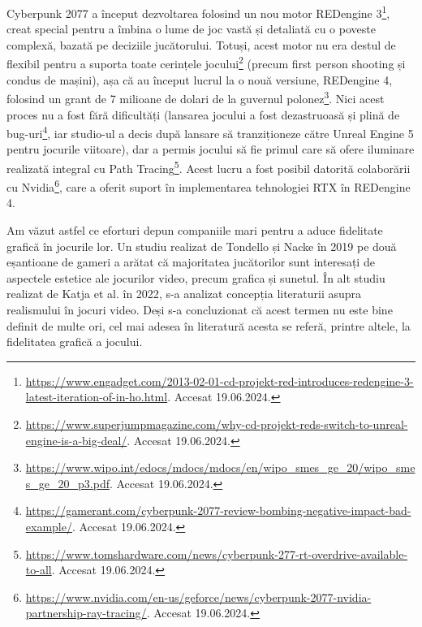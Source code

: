 \documentclass[12pt,a4paper]{report}
\numberwithin{equation}{section} %
\begin{document}
Cyberpunk 2077 a început dezvoltarea folosind un nou motor REDengine 3\footnote{\url{https://www.engadget.com/2013-02-01-cd-projekt-red-introduces-redengine-3-latest-iteration-of-in-ho.html}. Accesat 19.06.2024.},
creat special pentru a îmbina o lume de joc vastă și detaliată cu o poveste complexă,
bazată pe deciziile jucătorului. Totuși, acest motor nu era destul de flexibil pentru
a suporta toate cerințele jocului\footnote{\url{https://www.superjumpmagazine.com/why-cd-projekt-reds-switch-to-unreal-engine-is-a-big-deal/}. Accesat 19.06.2024.}
(precum first person shooting și condus de mașini),
așa că au început lucrul la o nouă versiune, REDengine 4, folosind un grant de 7 milioane
de dolari de la guvernul polonez\footnote{\label{UE5}\url{https://www.wipo.int/edocs/mdocs/mdocs/en/wipo_smes_ge_20/wipo_smes_ge_20_p3.pdf}. Accesat 19.06.2024.}.
Nici acest proces nu a fost fără dificultăți (lansarea jocului a fost dezastruoasă
și plină de bug-uri\footnote{\url{https://gamerant.com/cyberpunk-2077-review-bombing-negative-impact-bad-example/}. Accesat 19.06.2024.},
iar studio-ul a decis după lansare să tranziționeze către Unreal Engine 5 pentru jocurile viitoare),
dar a permis jocului să fie primul care să ofere iluminare realizată integral cu Path Tracing\footnote{\url{https://www.tomshardware.com/news/cyberpunk-277-rt-overdrive-available-to-all}. Accesat 19.06.2024.}.
Acest lucru a fost posibil datorită colaborării cu Nvidia\footnote{\url{https://www.nvidia.com/en-us/geforce/news/cyberpunk-2077-nvidia-partnership-ray-tracing/}. Accesat 19.06.2024.},
care a oferit suport în implementarea tehnologiei RTX în REDengine 4.

Am văzut astfel ce eforturi depun companiile mari pentru a aduce fidelitate grafică
în jocurile lor. Un studiu realizat de Tondello și Nacke în 2019\cite{Tondello} pe
două eșantioane de gameri a arătat că majoritatea jucătorilor sunt interesați
de aspectele estetice ale jocurilor video, precum grafica și sunetul. În alt
studiu realizat de Katja et al. în 2022\cite{Katja}, s-a analizat concepția
literaturii asupra realismului în jocuri video. Deși s-a concluzionat că acest
termen nu este bine definit de multe ori, cel mai adesea în literatură acesta
se referă, printre altele, la fidelitatea grafică a jocului.
\end{document}
